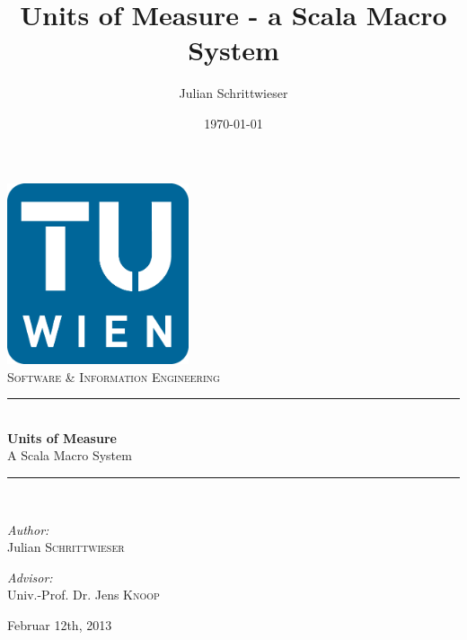 \documentclass[12pt,oneside,a4paper]{scrbook}
\title{Units of Measure - a Scala Macro System}
\author{Julian Schrittwieser}
\date{\today}
\theoremstyle{definition}
\newcommand{\HRule}{\rule{\linewidth}{0.5mm}}
\begin{document}
\begin{titlepage}

\begin{center}


\includegraphics[width=0.4\textwidth]{tu-logo.png}\\[3cm]


\textsc{\Large Software \& Information Engineering}\\[0.5cm]


\HRule \\[0.8cm]
{ \huge \bfseries Units of Measure}\\[0.4cm]
\Large A Scala Macro System

\HRule \\[1.5cm]

\vfill


\begin{minipage}{0.4\textwidth}
\begin{flushleft} \large
\emph{Author:}\\
Julian \textsc{Schrittwieser}
\end{flushleft}
\end{minipage}
\begin{minipage}{0.4\textwidth}
\begin{flushright} \large
\emph{Advisor:} \\
Univ.-Prof. Dr. Jens \textsc{Knoop}
\end{flushright}
\end{minipage}

\vfill

{\large Februar 12th, 2013}

\end{center}

\end{titlepage}

\setcounter{page}{2}
\end{document}
